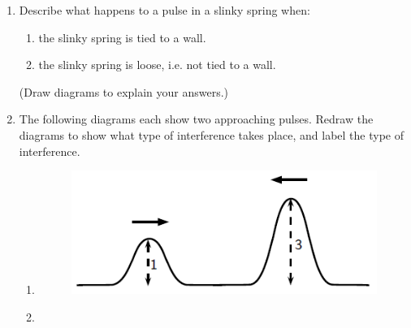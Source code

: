\begin{enumerate}[noitemsep, label=\textbf{\arabic*}. ]
\begin{figure}[H]
 \end{figure}   

    \addtocounter{footnote}{-0}
            \label{m38802*uid76}\item Describe what happens to a pulse in a slinky spring when:
\label{m38802*id316845}\begin{enumerate}[noitemsep, label=\textbf{\alph*}. ] 
            \label{m38802*uid77}\item the slinky spring is tied to a wall.
\label{m38802*uid78}\item the slinky spring is loose, i.e. not tied to a wall.
\end{enumerate}
        
(Draw diagrams to explain your answers.)\newline
            
\label{m38802*uid79}\item The following diagrams each show two approaching pulses. Redraw the diagrams to show what type of interference takes place, and label the type of interference.
\label{m38802*id316891}\begin{enumerate}[noitemsep, label=\textbf{\alph*}. ] 
            \label{m38802*uid80}\item 
    \setcounter{subfigure}{0}


	\begin{figure}[H] %
    \begin{center}
    \label{m38802*id316905!!!underscore!!!media}\label{m38802*id316905!!!underscore!!!printimage}\includegraphics[width=0.5\columnwidth]{col11305.imgs/m38802_PG10C4_032.png} %
        
      \vspace{2pt}
    \vspace{.1in}
    
    \end{center}

 \end{figure}   

    \addtocounter{footnote}{-0}
    \label{m38802*uid81}\item 
    \setcounter{subfigure}{0}



\end{enumerate}
\end{enumerate}
